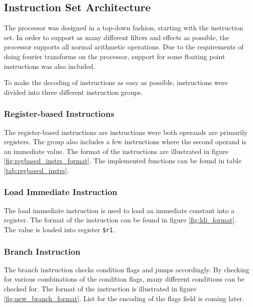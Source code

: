 \subsection{Instruction Set Architecture}\label{section:fpga-isa}

The processor was designed in a top-down fashion, starting with
the instruction set. In order to support as many different filters
and effects as possible, the processor supports all normal arithmetic
operations. Due to the requirements of doing fourier transforms on the
processor, support for some floating point instructions was also included.

To make the decoding of instructions as easy as possible, instructions
were divided into three different instruction groups.

\subsubsection{Register-based Instructions}

The register-based instructions are instructions were both operands are
primarily registers. The group also includes a few instructions where
the second operand is an immediate value. The format of the
instructions are illustrated in figure \ref{fig:regbased_instrs_format}. The
implemented functions can be found in table \ref{tab:regbased_instrs}.





\subsubsection{Load Immediate Instruction}
The load immediate instruction is used to load an immediate constant into a
register. The format of the instruction can be found in figure
\ref{fig:ldi_format}. The value is loaded into register \texttt{\$r1}.



\subsubsection{Branch Instruction}
The branch instruction checks condition flags and jumps accordingly. By
checking for various combinations of the condition flags, many different
conditions can be checked for. The format of the instruction is illustrated
in figure \ref{fig:new_branch_format}. List for the encoding of the flags field
is coming later.

